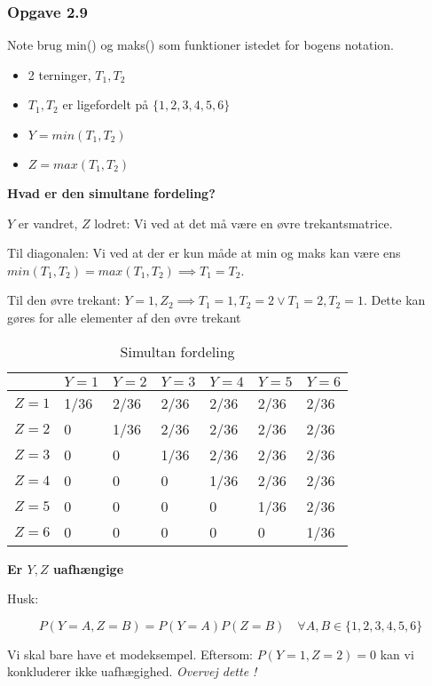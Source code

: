 \subsubsection{Opgave 2.9}

Note brug min() og maks() som funktioner istedet for bogens notation.

\begin{itemize}
    \item 2 terninger, $T_1, T_2$
    \item $T_1, T_2$ er ligefordelt på $\{1, 2, 3, 4, 5, 6\}$
    \item $Y = min(T_1, T_2)$
    \item $Z = max(T_1, T_2)$
\end{itemize}

\textbf{Hvad er den simultane fordeling?}

$Y$ er vandret, $Z$ lodret: Vi ved at det må være en øvre trekantsmatrice.

Til diagonalen: Vi ved at der er kun måde at min og maks kan være ens $min(T_1,T_2) = max(T_1, T_2) \implies T_1 = T_2$.

Til den øvre trekant: $Y = 1, Z_2 \implies T_1 = 1, T_2 = 2 \lor T_1=2, T_2 = 1$. Dette kan gøres for alle elementer af den øvre trekant

\begin{table}[ht]
\centering
\caption{Simultan fordeling}
\begin{tabular}{|l|l|l|l|l|l|l|}
\hline
      & $Y = 1$ & $Y=2$ & $Y=3$ & $Y=4$ & $Y=5$ & $Y=6$ \\ \hline
$Z=1$ & 1/36    & 2/36  & 2/36  & 2/36  & 2/36  & 2/36  \\ \hline
$Z=2$ & 0       & 1/36  & 2/36  & 2/36  & 2/36  & 2/36  \\ \hline
$Z=3$ & 0       & 0     & 1/36  & 2/36  & 2/36  & 2/36  \\ \hline
$Z=4$ & 0       & 0     & 0     & 1/36  & 2/36  & 2/36  \\ \hline
$Z=5$ & 0       & 0     & 0     & 0     & 1/36  & 2/36  \\ \hline
$Z=6$ & 0       & 0     & 0     & 0     & 0     & 1/36  \\ \hline
\end{tabular}
\end{table}


\textbf{Er $Y, Z$ uafhængige}

Husk:

\begin{equation}
    P(Y = A, Z = B) =P(Y=A)P(Z=B) \quad \forall A, B \in \{1, 2, 3, 4, 5, 6 \}
\end{equation}

Vi skal bare have et modeksempel.
Eftersom: $P(Y=1, Z=2)=0$ kan vi konkluderer ikke uafhægighed. \textit{Overvej dette !}

